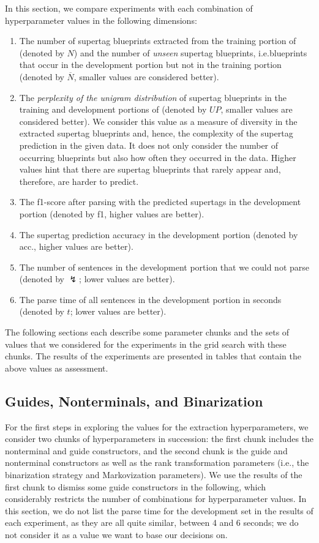 \documentclass[../../document.tex]{subfiles}
\begin{document}
    In this section, we compare experiments with each combination of hyperparameter values in the following dimensions:
    \begin{enumerate}
        \item The number of supertag blueprints extracted from the training portion of \negra{} (denoted by \(N\)) and the number of \emph{unseen} supertag blueprints, i.e.\@ blueprints that occur in the development portion but not in the training portion (denoted by \(\overline{N}\), smaller values are considered better).
        \item The \emph{perplexity of the unigram distribution} of supertag blueprints in the training and development portions of \negra{} (denoted by \(\mathit{UP}\), smaller values are considered better). We consider this value as a measure of diversity in the extracted supertag blueprints and, hence, the complexity of the supertag prediction in the given data. It does not only consider the number of occurring blueprints but also how often they occurred in the data. Higher values hint that there are supertag blueprints that rarely appear and, therefore, are harder to predict.
        \item The f1-score after parsing with the predicted supertags in the development portion (denoted by f1, higher values are better).
        \item The supertag prediction accuracy in the development portion (denoted by acc., higher values are better).
        \item The number of sentences in the development portion that we could not parse (denoted by $\lightning$; lower values are better).
        \item The parse time of all sentences in the development portion in seconds (denoted by \(t\); lower values are better).
    \end{enumerate}

    The following sections each describe some parameter chunks and the sets of values that we considered for the experiments in the grid search with these chunks.
    The results of the experiments are presented in tables that contain the above values as assessment.

    \subsection{Guides, Nonterminals, and Binarization}\label{sec:gridsearch:nts-guides}
    For the first steps in exploring the values for the extraction hyperparameters, we consider two chunks of hyperparameters in succession: the first chunk includes the nonterminal and guide constructors, and the second chunk is the guide and nonterminal constructors as well as the rank transformation parameters (i.e., the binarization strategy and Markovization parameters).
    We use the results of the first chunk to dismiss some guide constructors in the following, which considerably restricts the number of combinations for hyperparameter values.
    In this section, we do not list the parse time for the development set in the results of each experiment, as they are all quite similar, between 4 and 6 seconds; we do not consider it as a value we want to base our decisions on.
\end{document}
